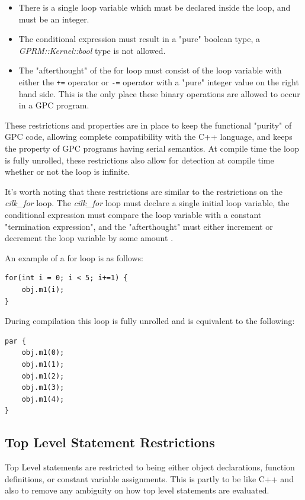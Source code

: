 \begin{itemize}
\item There is a single loop variable which must be declared inside the loop, and must be an integer.

\item The conditional expression must result in a "pure" boolean type, a \textit{GPRM::Kernel::bool}
     type is not allowed.

\item The "afterthought" of the for loop must consist of the loop variable with either the \texttt{+=} operator
      or \texttt{-=} operator with a "pure" integer value on the right hand side. This is the only place these
      binary operations are allowed to occur in a GPC program. 

\end{itemize}

These restrictions and properties are in place to keep the functional "purity" of GPC code,
allowing complete compatibility with the C++ language, and keeps the property of GPC programs
having serial semantics.  
At compile time the loop is fully unrolled, these restrictions also allow for detection
at compile time whether or not the loop is infinite.  

It's worth noting that these restrictions are similar to the restrictions on the \textit{cilk\_for} loop.
The \textit{cilk\_for} loop must declare a single initial loop variable, the conditional expression must 
compare the loop variable with a constant "termination expression", and the "afterthought" must either increment
or decrement the loop variable by some amount
\cite{cilkfor}.

An example of a for loop is as follows:


\begin{lstlisting}[style=myGPC]
for(int i = 0; i < 5; i+=1) {
    obj.m1(i);
}
\end{lstlisting}


During compilation this loop is fully unrolled and is equivalent
to the following:

\begin{lstlisting}[style=myGPC]
par {
    obj.m1(0);
    obj.m1(1);
    obj.m1(2);
    obj.m1(3);
    obj.m1(4);
}
\end{lstlisting}


\subsection{Top Level Statement Restrictions}
Top Level statements are restricted to being either object declarations, function definitions,
or constant variable assignments. This is partly to be like C++ and also to remove any ambiguity
on how top level statements are evaluated.


